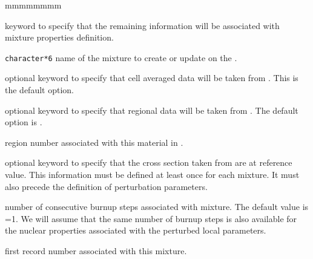 \begin{ListeDeDescription}{mmmmmmmm}
\item[\moc{MIX}] keyword to specify that the remaining information will be associated with mixture properties
definition. 

\item[\dusa{MIXNAM}] \texttt{character*6} name of the mixture to create or update on the .

\item[\moc{CELLAV}] optional keyword to specify that cell averaged data will be taken from . This is the
default option. 

\item[\moc{REGION}] optional keyword to specify that regional data will be taken from . The
default option is . 

\item[\dusa{noreg}] region number associated with this material in . 

\item[\moc{RC}] optional keyword to specify that the cross section taken from  are at reference value.
This information must be defined at least once for each mixture. It must also precede the definition of
perturbation parameters.

\item[\dusa{nburn}] number of consecutive burnup steps associated with mixture. The default value is =1.
We will assume that the same number of burnup steps is also available for the nuclear properties associated
with the perturbed local parameters.

\item[\dusa{frstrec}] first  record number associated with this mixture. 



\end{ListeDeDescription}
